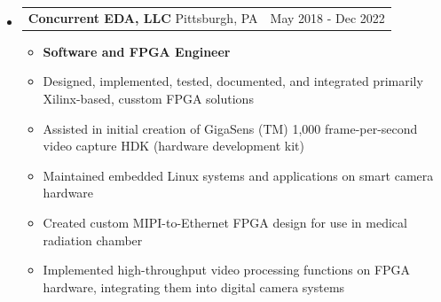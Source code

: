 \documentclass[20pt]{article}
\makeatletter
\providecommand{\tightlist}{
    \setlength{\itemsep}{0pt}\setlength{\parskip}{0pt}
}
\providecommand{\datetable}[2]{
    \begin{tabular*}{\textwidth}{@{}r @{\extracolsep{\fill}} l}
        #1 & #2
    \end{tabular*}
}
\makeatother
\begin{document}
\begin{itemize}[label={}]
        \item \datetable{
            \textbf{Concurrent EDA, LLC} \textbar{} Pittsburgh, PA
        }{May 2018 - Dec 2022}
        \begin{itemize}[topsep=0pt]\tightlist
            \item \textbf{Software and FPGA Engineer}
            \item Designed, implemented, tested, documented, and integrated primarily Xilinx-based, cusstom FPGA solutions 
            \item Assisted in initial creation of GigaSens (TM) 1,000 frame-per-second video capture HDK (hardware development kit)
            \item Maintained embedded Linux systems and applications on smart camera hardware
            \item Created custom MIPI-to-Ethernet FPGA design for use in medical radiation chamber
            \item Implemented high-throughput video processing functions on FPGA hardware, integrating them into digital camera systems
        \end{itemize}


\end{itemize}
\end{document}
